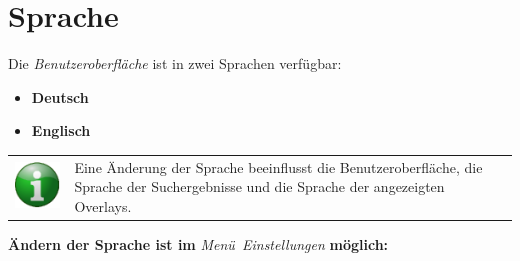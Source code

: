\documentclass[10pt]{scrreprt}
\newcommand{\textref}[1]{\mbox{\raisebox{0.1ex}{\small$\rightarrow$ }\textit{#1}}}
\begin{document}
\newpage
\section{Sprache}  
Die \textref{Benutzeroberfläche} ist in zwei Sprachen verfügbar:
\begin{itemize}
\item \textbf{Deutsch}
\item \textbf{Englisch}
\end{itemize}

\vspace{3mm}
\begin{tabular}{>{\centering \arraybackslash}m{1cm} m{14cm}} \index{Overlays}
\includegraphics[scale=0.5]{images/info.eps} & Eine Änderung der Sprache beeinflusst die Benutzeroberfläche, die Sprache der Suchergebnisse und die Sprache der angezeigten Overlays.
\end{tabular}

\vspace{5mm}
\textbf{Ändern der Sprache ist im} \textref{Menü Einstellungen} \textbf{möglich:}  
\end{document}
